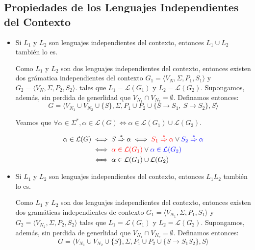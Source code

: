 \subsection{Propiedades de los Lenguajes Independientes del Contexto}
\begin{itemize}
  \item Si \(L_1\) y \(L_2\) son lenguajes independientes del contexto, entonces \(L_1 \cup L_2\) también lo es.
        \begin{demo}[0.8\textwidth]
          Como \(L_1\) y \(L_2\) son dos lenguajes independientes del contexto, entonces existen dos grámatica independientes del contexto \(G_1=\langle V_N, \Sigma, P_1, S_1 \rangle\) y \(G_2=\langle V_N, \Sigma, P_2, S_2 \rangle\). tales que \(L_1 = \mathcal{L}(G_1)\) y \(L_2 = \mathcal{L}(G_2)\). Supongamos, además, sin perdida de generlidad que \(V_{N_1}\cap V_{N_2} = \emptyset\). Definamos entonces:
          \[ G = \langle V_{N_1} \cup V_{N_2} \cup \{S\}, \Sigma, P_1 \cup P_2 \cup \{ S \to S_1,~S\to S_2\}, S \rangle \]

          Veamos que \(\forall\alpha\in\Sigma^*, \alpha\in\mathcal{L}(G) \iff \alpha\in\mathcal{L}(G_1) \cup \mathcal{L}(G_2)\).

          \begin{align*}
            \alpha\in\mathcal{L}(G) & \iff S\overset{*}{\Rightarrow}\alpha \iff {\color{red}S_1 \overset{*}{\Rightarrow}\alpha} \lor {\color{blue}S_2\overset{*}{\Rightarrow}\alpha} \\
                                    & \iff {\color{red}\alpha\in\mathcal{L}(G_1)} \lor {\color{blue}\alpha\in\mathcal{L}(G_2)}      \\
                                    & \iff \alpha\in\mathcal{L}(G_1) \cup \mathcal{L}(G_2)
          \end{align*}
        \end{demo}
  \item Si \(L_1\) y \(L_2\) son lenguajes independientes del contexto, entonces \(L_1L_2\) también lo es.
        \begin{demo}[0.8\textwidth]
          Como \(L_1\) y \(L_2\) son dos lenguajes independientes del contexto, entonces existen dos gramáticas independientes de contexto \(G_1=\langle V_{N_1}, \Sigma, P_1, S_1 \rangle\) y \(G_2=\langle V_{N_2}, \Sigma, P_2, S_2 \rangle\) tales que \(L_1 = \mathcal{L}(G_1)\) y \(L_2 = \mathcal{L}(G_2)\). Supongamos, además, sin perdida de generlidad que \(V_{N_1}\cap V_{N_2} = \emptyset\). Definamos entonces:
          \[ G = \langle V_{N_1} \cup V_{N_2} \cup \{S\}, \Sigma, P_1 \cup P_2 \cup \{ S \to S_1S_2\}, S \rangle \]


\end{demo}
\end{itemize}
